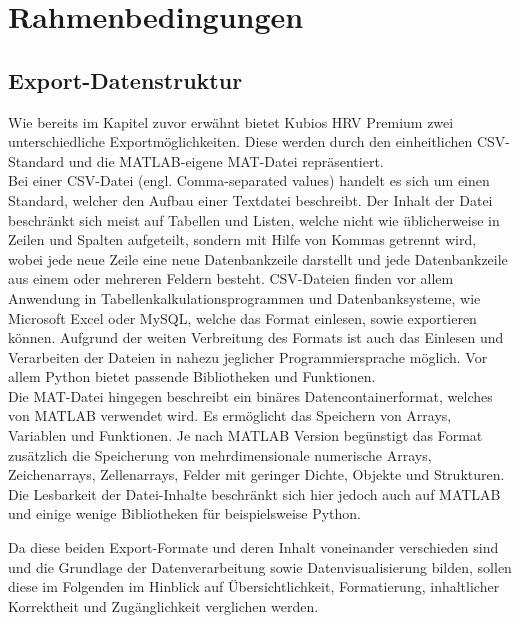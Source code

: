 
\chapter{Rahmenbedingungen}


\section{Export-Datenstruktur}

Wie bereits im Kapitel zuvor erwähnt bietet Kubios HRV Premium zwei unterschiedliche Exportmöglichkeiten. Diese werden durch den einheitlichen \acs{CSV}-Standard und die MATLAB-eigene MAT-Datei repräsentiert.\\
Bei einer \acs{CSV}-Datei (engl. Comma-separated values) handelt es sich um einen Standard, welcher den Aufbau einer Textdatei beschreibt. Der Inhalt der Datei beschränkt sich meist auf Tabellen und Listen, welche nicht wie üblicherweise in Zeilen und Spalten aufgeteilt, sondern mit Hilfe von Kommas getrennt wird, wobei jede neue Zeile eine neue Datenbankzeile darstellt und jede Datenbankzeile aus einem oder mehreren Feldern besteht. \acs{CSV}-Dateien finden vor allem Anwendung in Tabellenkalkulationsprogrammen und Datenbanksysteme, wie Microsoft Excel oder MySQL, welche das Format einlesen, sowie exportieren können. Aufgrund der weiten Verbreitung des Formats ist auch das Einlesen und Verarbeiten der Dateien in nahezu jeglicher Programmiersprache möglich. Vor allem Python bietet passende Bibliotheken und Funktionen.\cite{csv}\\
Die MAT-Datei hingegen beschreibt ein binäres Datencontainerformat, welches von MATLAB verwendet wird. Es ermöglicht das Speichern von Arrays, Variablen und Funktionen. Je nach MATLAB Version begünstigt das Format zusätzlich die Speicherung von mehrdimensionale numerische Arrays, Zeichenarrays, Zellenarrays, Felder mit geringer Dichte, Objekte und Strukturen. Die Lesbarkeit der Datei-Inhalte beschränkt sich hier jedoch auch auf MATLAB und einige wenige Bibliotheken für beispielsweise Python.\cite{mat}

Da diese beiden Export-Formate und deren Inhalt voneinander verschieden sind und die Grundlage der Datenverarbeitung sowie Datenvisualisierung bilden, sollen diese im Folgenden im Hinblick auf Übersichtlichkeit, Formatierung, inhaltlicher Korrektheit und Zugänglichkeit verglichen werden.

